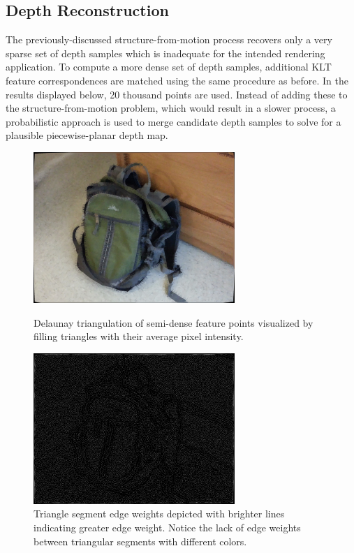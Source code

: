\documentclass[conference]{acmsiggraph}
\begin{document}
\subsection{Depth Reconstruction}

The previously-discussed structure-from-motion process recovers
only a very sparse set of depth samples which is inadequate
for the intended rendering application.
To compute a more dense set of depth samples, additional KLT feature
correspondences are matched using the same procedure as before.
In the results displayed below, 20 thousand points are used.
Instead of adding these to the structure-from-motion problem,
which would result in a slower process, a probabilistic
approach is used to merge candidate depth samples
to solve for a plausible piecewise-planar depth map.

\begin{figure}[ht]
  \centering
  \includegraphics[width=3in]{images/delaunay}
  \caption{Delaunay triangulation of semi-dense feature points visualized
      by filling triangles with their average pixel intensity.}
  \label{fig:delaunay}
  \includegraphics[width=3in]{images/delaunay_edges}
  \caption{Triangle segment edge weights depicted with brighter lines
  indicating greater edge weight.  Notice the lack of edge weights
  between triangular segments with different colors.}
  \label{fig:delaunay_edges}
\end{figure}
\end{document}

